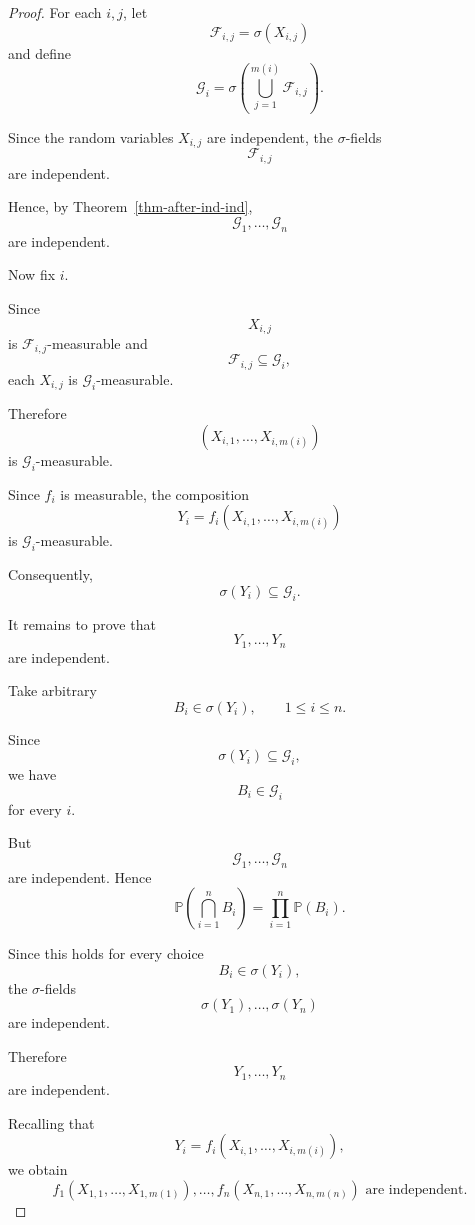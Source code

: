 \begin{proof}

For each $i,j$, let
\[
\mathcal{F}_{i,j}
=
\sigma(X_{i,j})
\]
and define
\[
\mathcal{G}_i
=
\sigma\left(
\bigcup_{j=1}^{m(i)}
\mathcal{F}_{i,j}
\right).
\]

Since the random variables $X_{i,j}$ are independent, the
$\sigma$-fields
\[
\mathcal{F}_{i,j}
\]
are independent.

Hence, by Theorem~\ref{thm-after-ind-ind},
\[
\mathcal{G}_1,\ldots,\mathcal{G}_n
\]
are independent.

\medskip

Now fix $i$.

Since
\[
X_{i,j}
\]
is $\mathcal{F}_{i,j}$-measurable and
\[
\mathcal{F}_{i,j}\subseteq\mathcal{G}_i,
\]
each $X_{i,j}$ is $\mathcal{G}_i$-measurable.

Therefore
\[
(X_{i,1},\ldots,X_{i,m(i)})
\]
is $\mathcal{G}_i$-measurable.

Since $f_i$ is measurable, the composition
\[
Y_i
=
f_i(X_{i,1},\ldots,X_{i,m(i)})
\]
is $\mathcal{G}_i$-measurable.

Consequently,
\[
\sigma(Y_i)\subseteq\mathcal{G}_i.
\]

\medskip

It remains to prove that
\[
Y_1,\ldots,Y_n
\]
are independent.

Take arbitrary
\[
B_i\in\sigma(Y_i),
\qquad
1\leq i\leq n.
\]

Since
\[
\sigma(Y_i)\subseteq\mathcal{G}_i,
\]
we have
\[
B_i\in\mathcal{G}_i
\]
for every $i$.

But
\[
\mathcal{G}_1,\ldots,\mathcal{G}_n
\]
are independent. Hence
\[
\mathbb{P}\left(
\bigcap_{i=1}^{n}B_i
\right)
=
\prod_{i=1}^{n}\mathbb{P}(B_i).
\]

Since this holds for every choice
\[
B_i\in\sigma(Y_i),
\]
the $\sigma$-fields
\[
\sigma(Y_1),\ldots,\sigma(Y_n)
\]
are independent.

Therefore
\[
Y_1,\ldots,Y_n
\]
are independent.

Recalling that
\[
Y_i
=
f_i(X_{i,1},\ldots,X_{i,m(i)}),
\]
we obtain
\[
\boxed{
f_1(X_{1,1},\ldots,X_{1,m(1)}),
\ldots,
f_n(X_{n,1},\ldots,X_{n,m(n)})
\text{ are independent}.
}
\]

\end{proof}



